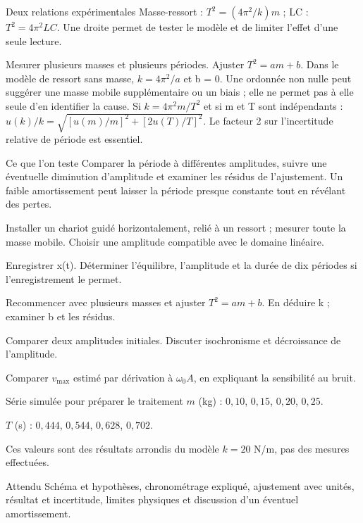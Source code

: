 \begin{loi}{Deux relations expérimentales}
Masse-ressort : $T^2=(4\pi^2/k)m$ ; LC : $T^2=4\pi^2LC$. Une droite permet de tester le modèle et de limiter l’effet d’une seule lecture.
\end{loi}
Mesurer plusieurs masses et plusieurs périodes. Ajuster $T^2=am+b$. Dans le modèle de ressort sans masse, $k=4\pi^2/a$ et b = 0. Une ordonnée non nulle peut suggérer une masse mobile supplémentaire ou un biais ; elle ne permet pas à elle seule d’en identifier la cause.
Si $k=4\pi^2m/T^2$ et si m et T sont indépendants : $u(k)/k=\sqrt{[u(m)/m]^2+[2u(T)/T]^2}$. Le facteur 2 sur l’incertitude relative de période est essentiel.
\begin{methode}{Ce que l’on teste}
Comparer la période à différentes amplitudes, suivre une éventuelle diminution d’amplitude et examiner les résidus de l’ajustement. Un faible amortissement peut laisser la période presque constante tout en révélant des pertes.
\end{methode}


\begin{questions}
\item Installer un chariot guidé horizontalement, relié à un ressort ; mesurer toute la masse mobile. Choisir une amplitude compatible avec le domaine linéaire.
\item Enregistrer x(t). Déterminer l’équilibre, l’amplitude et la durée de dix périodes si l’enregistrement le permet.
\item Recommencer avec plusieurs masses et ajuster $T^2=am+b$. En déduire k ; examiner b et les résidus.
\item Comparer deux amplitudes initiales. Discuter isochronisme et décroissance de l’amplitude.
\item Comparer $v_{\max}$ estimé par dérivation à $\omega_0A$, en expliquant la sensibilité au bruit.
\end{questions}
\begin{docu}{Série simulée pour préparer le traitement}
$m$ (kg) : $0{,}10$, $0{,}15$, $0{,}20$, $0{,}25$.\par $T$ (s) : $0{,}444$, $0{,}544$, $0{,}628$, $0{,}702$.\par Ces valeurs sont des résultats arrondis du modèle $k=20$ N/m, pas des mesures effectuées.
\end{docu}
\begin{methode}{Attendu}
Schéma et hypothèses, chronométrage expliqué, ajustement avec unités, résultat et incertitude, limites physiques et discussion d’un éventuel amortissement.
\end{methode}


